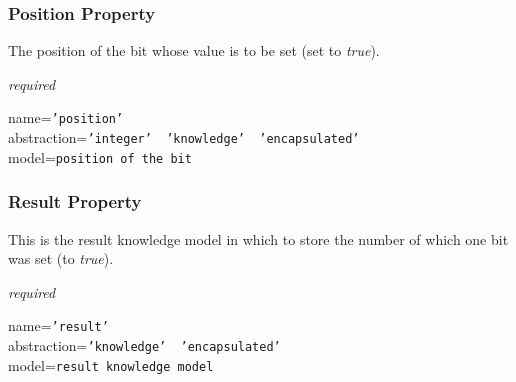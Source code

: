 \subsubsection{Position Property}

The position of the bit whose value is to be set (set to \emph{true}).

\emph{required}

name=\texttt{'position'}\\
abstraction=\texttt{'integer' \vline\ 'knowledge' \vline\ 'encapsulated'}\\
model=\texttt{position of the bit}

\subsubsection{Result Property}

This is the result knowledge model in which to store the number of which one
bit was set (to \emph{true}).

\emph{required}

name=\texttt{'result'}\\
abstraction=\texttt{'knowledge' \vline\ 'encapsulated'}\\
model=\texttt{result knowledge model}
